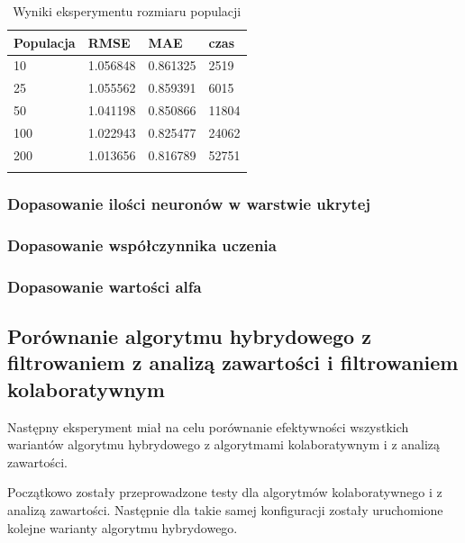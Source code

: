 \documentclass[twoside]{iisthesis}
\begin{document}
		\begin{longtable}{llll}
			\label{tab:exppopulation}
			\centering
			\textbf{Populacja} & \textbf{RMSE} & \textbf{MAE} & \textbf{czas} \\
			\hline
			10        & 1.056848 & 0.861325 & 2519                      \\
			25        & 1.055562 & 0.859391 & 6015                      \\
			50        & 1.041198 & 0.850866 & 11804                     \\
			100       & 1.022943 & 0.825477 & \multicolumn{1}{r}{24062} \\
			200       & 1.013656 & 0.816789 & 52751                     \\
			\caption{Wyniki eksperymentu rozmiaru populacji}
		\end{longtable}
	

		
		\subsubsection{Dopasowanie ilości neuronów w warstwie ukrytej}
		
		
		\subsubsection{Dopasowanie współczynnika uczenia}
		
		
		\subsubsection{Dopasowanie wartości alfa}
		

		\subsection{Porównanie algorytmu hybrydowego z filtrowaniem z analizą zawartości i filtrowaniem kolaboratywnym}
		
		Następny eksperyment miał na celu porównanie efektywności wszystkich wariantów algorytmu hybrydowego z algorytmami kolaboratywnym i z analizą zawartości. 
		
		Początkowo zostały przeprowadzone testy dla algorytmów kolaboratywnego i z analizą zawartości. Następnie dla takie samej konfiguracji zostały uruchomione kolejne warianty algorytmu hybrydowego.
		
\end{document}
